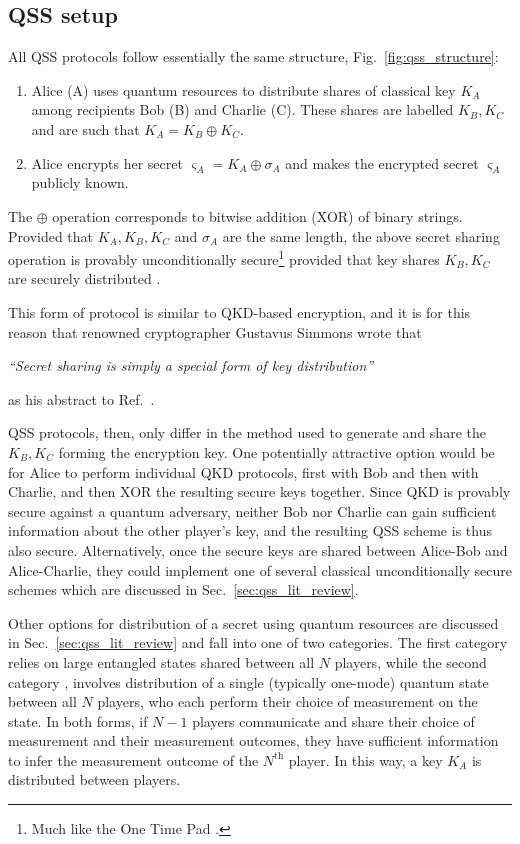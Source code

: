 \subsection{QSS setup}

All QSS protocols follow essentially the same structure, Fig.~\ref{fig:qss_structure}:
\begin{enumerate}
\item Alice (A) uses quantum resources to distribute shares of classical key $K_A$ among recipients Bob (B) and Charlie (C). These shares are labelled $K_B, K_C$ and are such that $K_A = K_B \oplus K_C$.
\item Alice encrypts her secret $\varsigma_A = K_A \oplus \sigma_A$ and makes the encrypted secret $\varsigma_A$ publicly known.
\end{enumerate}
The $\oplus$ operation corresponds to bitwise addition (XOR) of binary strings. Provided that $K_A, K_B, K_C$ and $\sigma_A$ are the same length, the above secret sharing operation is provably unconditionally secure\footnote{Much like the One Time Pad \cite{Schneier1996}.} provided that key shares $K_B, K_C$ are securely distributed \cite{Schneier1996}.

This form of protocol is similar to QKD-based encryption, and it is for this reason that renowned cryptographer Gustavus Simmons wrote that 

\begin{center}\emph{``Secret sharing is simply a special form of key distribution''}\end{center}

\noindent as his abstract to Ref.~\cite{Simmons1990a}.

QSS protocols, then, only differ in the method used to generate and share the $K_B, K_C$ forming the encryption key. One potentially attractive option would be for Alice to perform individual QKD protocols, first with Bob and then with Charlie, and then XOR the resulting secure keys together. Since QKD is provably secure against a quantum adversary, neither Bob nor Charlie can gain sufficient information about the other player's key, and the resulting QSS scheme is thus also secure. Alternatively, once the secure keys are shared between Alice-Bob and Alice-Charlie, they could implement one of several classical unconditionally secure schemes which are discussed in Sec.~\ref{sec:qss_lit_review}.

Other options for distribution of a secret using quantum resources are discussed in Sec.~\ref{sec:qss_lit_review} and fall into one of two categories. The first category \cite{Hillery1999, Karlsson1999, Gottesman1999, Markham2008, Wu2016, Kogias2017} relies on large entangled states shared between all $N$ players, while the second category \cite{Zhang2005, Schmid2005, Schmid2007, Grice2019}, involves distribution of a single (typically one-mode) quantum state between all $N$ players, who each perform their choice of measurement on the state. In both forms, if $N-1$ players communicate and share their choice of measurement and their measurement outcomes, they have sufficient information to infer the measurement outcome of the $N^{\text{th}}$ player. In this way, a key $K_A$ is distributed between players.


